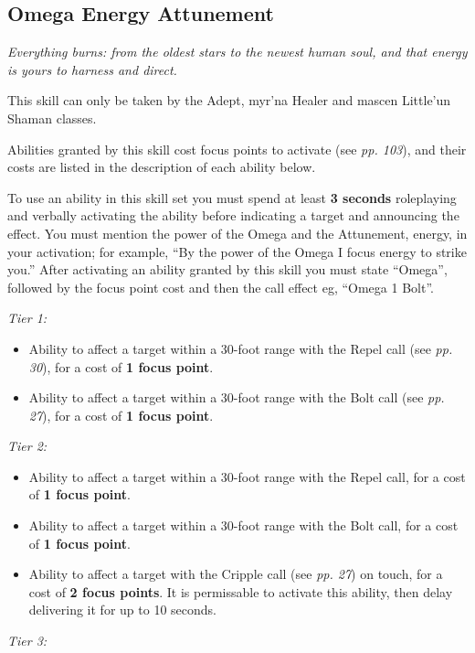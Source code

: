 \documentclass{scrbook}
\begin{document}
\subsection{Omega Energy Attunement}

\textit{Everything burns: from the oldest stars to the newest human soul, and that energy is yours to harness and direct.}

This skill can only be taken by the Adept, myr'na Healer and mascen Little'un Shaman classes.

Abilities granted by this skill cost focus points to activate (see \textit{pp. 103}), and their costs are listed in the description of each ability below.

To use an ability in this skill set you must spend at least \textbf{3 seconds} roleplaying and verbally activating the ability before indicating a target and announcing the effect. You must mention the power of the Omega and the Attunement, energy, in your activation; for example, ``By the power of the Omega I focus energy to strike you.'' After activating an ability granted by this skill you must state ``Omega'', followed by the focus point cost and then the call effect eg, ``Omega 1 Bolt''.

\textit{Tier 1:}

\begin{itemize}
\item Ability to affect a target within a 30-foot range with the Repel call (see \textit{pp. 30}), for a cost of \textbf{1 focus point}.

\item Ability to affect a target within a 30-foot range with the Bolt call (see \textit{pp. 27}), for a cost of \textbf{1 focus point}.

\end{itemize}
\textit{Tier 2:}

\begin{itemize}
\item Ability to affect a target within a 30-foot range with the Repel call, for a cost of \textbf{1 focus point}.

\item Ability to affect a target within a 30-foot range with the Bolt call, for a cost of \textbf{1 focus point}.

\item Ability to affect a target with the Cripple call (see \textit{pp. 27}) on touch, for a cost of \textbf{2 focus points}. It is permissable to activate this ability, then delay delivering it for up to 10 seconds.

\end{itemize}
\textit{Tier 3:}
\end{document}
